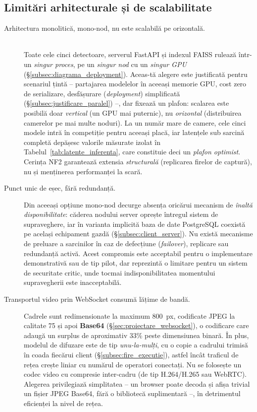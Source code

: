 \documentclass[../../main.tex]{subfiles}
\begin{document}
\subsection{Limitări arhitecturale și de scalabilitate}

\begin{description}
	\item[Arhitectura monolitică, mono-nod, nu este scalabilă pe orizontală.] \hfill \\ 
	Toate cele cinci detectoare, serverul FastAPI și indexul FAISS rulează într-un \emph{singur proces}, pe un \emph{singur nod} cu un \emph{singur GPU} (\S\ref{subsec:diagrama_deployment}). Aceas-tă alegere este justificată pentru scenariul țintă -- partajarea modelelor în aceeași memorie GPU, cost zero de serializare, desfășurare (\textit{deployment}) simplificată (\S\ref{subsec:justificare_paralel}) --, dar fixează un plafon: scalarea este posibilă doar \emph{vertical} (un GPU mai puternic), nu \emph{orizontal} (distribuirea camerelor pe mai multe noduri). La un număr mare de camere, cele cinci modele intră în competiție pentru aceeași placă, iar latențele sub sarcină completă depășesc valorile măsurate izolat în Tabelul~\ref{tab:latente_inferenta}, care constituie deci un \emph{plafon optimist}. Cerința NF2 garantează extensia \emph{structurală} (replicarea firelor de captură), nu și menținerea performanței la scară.
	
	\item[Punct unic de eșec, fără redundanță.] Din aceeași opțiune mono-nod decurge absența oricărui mecanism de \emph{înaltă disponibilitate}: căderea nodului server oprește întregul sistem de supraveghere, iar în varianta implicită baza de date PostgreSQL coexistă pe același echipament gazdă (\S\ref{subsec:client_server}). Nu există mecanisme de preluare a sarcinilor în caz de defecțiune (\textit{failover}), replicare sau redundanță activă. Acest compromis este acceptabil pentru o implementare demonstrativă sau de tip pilot, dar reprezintă o limitare pentru un sistem de securitate critic, unde tocmai indisponibilitatea momentului supravegherii este inacceptabilă.
	
	\item[Transportul video prin WebSocket consumă lățime de bandă.] Cadrele sunt redimensionate la maximum 800~px, codificate JPEG la calitate 75 și apoi \textbf{Base64} (\S\ref{sec:proiectare_websocket}), o codificare care adaugă un surplus de aproximativ 33\% peste dimensiunea binară. În plus, modelul de difuzare este de tip \emph{unu-la-mulți}, cu o copie a cadrului trimisă în coada fiecărui client (\S\ref{subsec:fire_executie}), astfel încât traficul de rețea crește liniar cu numărul de operatori conectați. Nu se folosește un codec video cu compresie inter-cadru (de tip H.264/H.265 sau WebRTC). Alegerea privilegiază simplitatea -- un browser poate decoda și afișa trivial un fișier JPEG Base64, fără o bibliotecă suplimentară --, în detrimentul eficienței la nivel de rețea.
	
\end{description}
\end{document}
